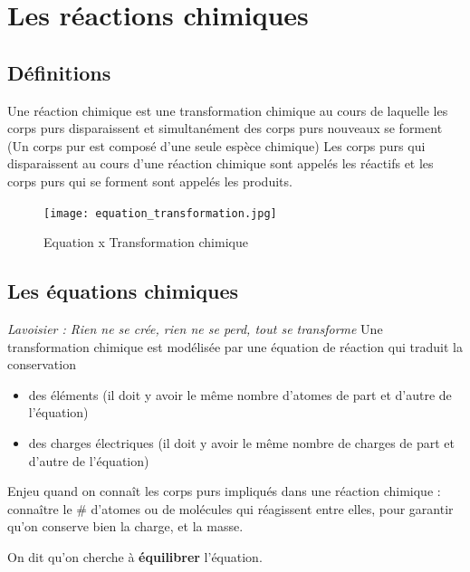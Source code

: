 \documentclass[a4paper,12pt]{article}
\begin{document}
\section{Les réactions chimiques}

\subsection{Définitions}

\begin{tcolorbox}[colback=green!10!white, colframe=green!75!black, title=Structure de l'atome]
  Une réaction chimique est une transformation chimique au cours de laquelle les corps purs disparaissent et simultanément des corps purs nouveaux se forment (Un corps pur est composé d'une seule espèce chimique)
  Les corps purs qui disparaissent au cours d’une réaction chimique sont appelés les réactifs et les corps purs qui se forment sont appelés les produits.
\end{tcolorbox}

\begin{figure}[H]
  \centering
  \texttt{[image: equation\_transformation.jpg]}
  \caption{\label{} Equation x Transformation chimique}
\end{figure}

\subsection{Les équations chimiques}

\textit{Lavoisier : Rien ne se crée, rien ne se perd, tout se transforme}
\vspace{1em}
Une transformation chimique est modélisée par une équation de réaction qui traduit la conservation 
\begin{itemize}[noitemsep]
  \item des éléments (il doit y avoir le même nombre d'atomes de part et d'autre de l'équation)
  \item des charges électriques (il doit y avoir le même nombre de charges de part et d'autre de l'équation)
\end{itemize}

Enjeu quand on connaît les corps purs impliqués dans une réaction chimique : connaître le \# d'atomes ou de molécules qui réagissent entre elles, pour garantir qu'on conserve bien la charge, et la masse. \par
On dit qu'on cherche à \textbf{équilibrer} l'équation.

\vspace{1em}
\end{document}
